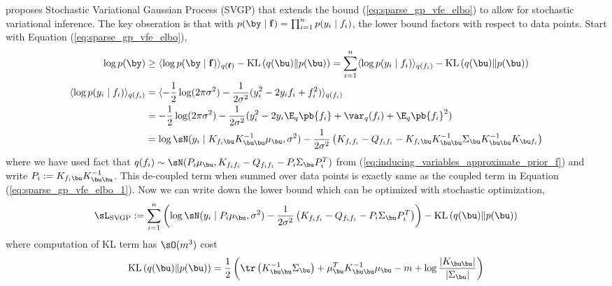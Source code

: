 \documentclass[11pt]{article}
\renewcommand\bf{\ensuremath{\mathbf{f}}}
\begin{document}
\cite{hensmanGaussianProcessesBig2013} proposes Stochastic Variational Gaussian Process (SVGP) that extends the bound (\ref{eq:sparse_gp_vfe_elbo}) to allow for stochastic variational inference. The key obseration is that with $p(\by\mid\bf) = \prod_{i=1}^n p(y_i\mid f_i)$, the lower bound factors with respect to data points. Start with Equation (\ref{eq:sparse_gp_vfe_elbo}),
\begin{align}
    \log p(\by) 
        &\geq \langle \log p(\by\mid\bf) \rangle_{q(\bf)} - \text{KL}\left( q(\bu) \Vert p(\bu) \right) 
        = \sum_{i=1}^n \langle  \log p(y_i\mid f_i) \rangle_{q(f_i)} - \text{KL}\left( q(\bu) \Vert p(\bu) \right) \\
    \langle  \log p(y_i\mid f_i) \rangle_{q(f_i)}
        &= \langle -\frac{1}{2} \log (2\pi \sigma^2) - \frac{1}{2\sigma^2} (y_i^2 - 2y_if_i + f_i^2) \rangle_{q(f_i)} \\
        &=  -\frac{1}{2} \log (2\pi \sigma^2) - \frac{1}{2\sigma^2} (y_i^2 - 2y_i \E_q\pb{f_i}  + \var_q(f_i) + \E_q\pb{f_i}^2 ) \\
        &= \log \sN(y_i \mid K_{f_i\bu} K_{\bu\bu}^{-1} \mu_{\bu}, \sigma^2) - \frac{1}{2\sigma^2} \left( K_{f_if_i} - Q_{f_if_i} - K_{f_i\bu} K_{\bu\bu}^{-1} \Sigma_{\bu} K_{\bu\bu}^{-1} K_{\bu f_i}  \right)
\end{align}
where we have used fact that $q(f_i) \sim \sN(P_i \mu_{\bu}, K_{f_if_i} - Q_{f_if_i} - P_i \Sigma_{\bu} P_i^T )$ from (\ref{eq:inducing_variables_approximate_prior_f}) and write $P_i :=  K_{f_i\bu} K_{\bu\bu}^{-1}$. This de-coupled term when summed over data points is exactly same as the coupled term in Equation (\ref{eq:sparse_gp_vfe_elbo_1}). Now we can write down the lower bound which can be optimized with stochastic optimization,
\begin{align}
    \sL_{\text{SVGP}}
        := \sum_{i=1}^n \left(
            \log \sN(y_i \mid P_i \mu_{\bu}, \sigma^2) - \frac{1}{2\sigma^2} \left( K_{f_if_i} - Q_{f_if_i} - P_i \Sigma_{\bu} P_i^T  \right)
        \right) - \text{KL}\left(q(\bu)\Vert p(\bu)\right)
\end{align}
where computation of KL term has $\sO(m^3)$ cost
\begin{align}
    \text{KL}\left(q(\bu)\Vert p(\bu)\right)
        = \frac{1}{2} \left(
            \tr\left( K_{\bu\bu}^{-1} \Sigma_{\bu} \right) + \mu_{\bu}^T K_{\bu\bu}^{-1} \mu_{\bu} - m + \log \frac{|K_{\bu\bu}|}{|\Sigma_{\bu}|} 
        \right)
\end{align}
\end{document}
